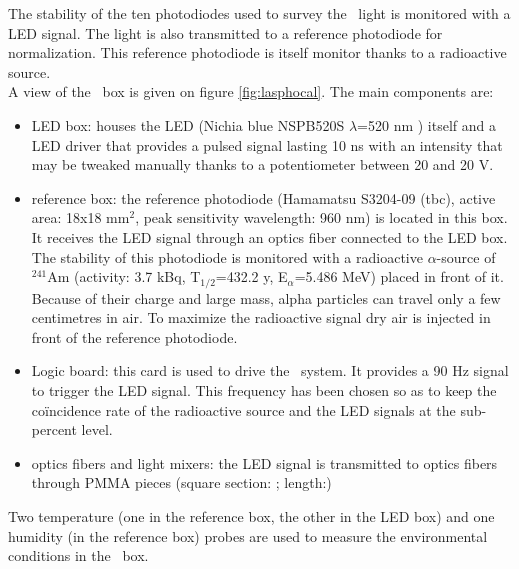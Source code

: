 The stability of the ten photodiodes used to survey the \laser~light is monitored with a LED signal. The light is also transmitted to a reference photodiode for normalization. This reference photodiode is itself monitor thanks to a radioactive source.\\
A view of the \phocal~box is given on figure \ref{fig:lasphocal}. The main components are:
\begin{itemize}
\item LED box: houses the LED (Nichia blue NSPB520S $\lambda$=520 nm \cite{ref:led}) itself and a LED driver that provides a pulsed signal lasting 10 ns with an intensity that may be tweaked manually thanks to a potentiometer between 20 and 20 V.
\item reference box: the reference photodiode (Hamamatsu S3204-09 (tbc), active area: 18x18 mm$^2$, peak sensitivity wavelength: 960 nm) is located in this box. It receives the LED signal through an optics fiber connected to the LED box. The stability of this photodiode is monitored with a radioactive $\alpha$-source of $^{241}$Am (activity: 3.7 kBq, T$_{1/2}$=432.2 y, E$_{\alpha}$=5.486 MeV) placed in front of it. Because of their charge and large mass, alpha particles can travel only a few centimetres in air. To maximize the radioactive signal dry air is injected in front of the reference photodiode.
\item Logic board: this card is used to drive the \phocal~system. It provides a 90 Hz signal to trigger the LED signal. This frequency has been chosen so as to keep the coïncidence rate of the radioactive source and the LED signals at the sub-percent level.
\item optics fibers and light mixers: the LED signal is transmitted to optics fibers through PMMA pieces (square section: ; length:) 
\end{itemize}
Two temperature (one in the reference box, the other in the LED box) and one humidity (in the reference box) probes are used to measure the environmental conditions in the \phocal~box. 

